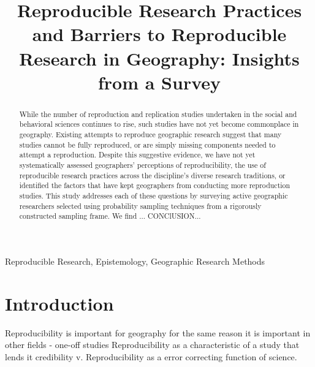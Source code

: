 \documentclass[]{interact}
\theoremstyle{plain}%
\theoremstyle{definition}
\theoremstyle{remark}
\begin{document}

\title{Reproducible Research Practices and Barriers to Reproducible Research in Geography: Insights from a Survey}

\author{
}

\maketitle

\begin{abstract}
While the number of reproduction and replication studies undertaken in the social and behavioral sciences continues to rise, such studies have not yet become commonplace in geography. 
Existing attempts to reproduce geographic research suggest that many studies cannot be fully reproduced, or are simply missing components needed to attempt a reproduction. 
Despite this suggestive evidence, we have not yet systematically assessed geographers' perceptions of reproducibility, the use of reproducible research practices across the discipline's diverse research traditions, or identified the factors that have kept geographers from conducting more reproduction studies.
This study addresses each of these questions by surveying active geographic researchers selected using probability sampling techniques from a rigorously constructed sampling frame.
We find ...
CONClUSION...

\end{abstract}

\begin{keywords}
Reproducible Research, Epistemology, Geographic Research Methods
\end{keywords}

\newpage
\section*{Introduction}
Reproducibility is important for geography for the same reason it is important in other fields - one-off studies 
Reproducibility as a characteristic of a study that lends it credibility v. Reproducibility as a error correcting function of science. 
\end{document}
